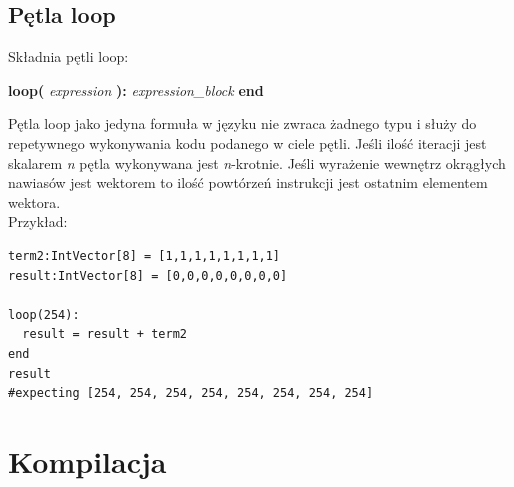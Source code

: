 \subsection{Pętla loop}
Składnia pętli loop:
\begin{center}
\textbf{loop(} \textit{expression} \textbf{):} \textit{expression\_block} \textbf{end}
\end{center}
Pętla loop jako jedyna formuła w języku nie zwraca żadnego typu i służy do repetywnego wykonywania kodu podanego w ciele pętli. Jeśli ilość iteracji jest skalarem \textit{n} pętla wykonywana jest \textit{n}-krotnie. Jeśli wyrażenie wewnętrz okrągłych nawiasów jest wektorem to ilość powtórzeń instrukcji jest ostatnim elementem wektora.\\
Przykład:
\begin{lstlisting}[frame=single]
term2:IntVector[8] = [1,1,1,1,1,1,1,1]
result:IntVector[8] = [0,0,0,0,0,0,0,0]

loop(254):
  result = result + term2
end
result
#expecting [254, 254, 254, 254, 254, 254, 254, 254] 
\end{lstlisting}

\section{Kompilacja}
